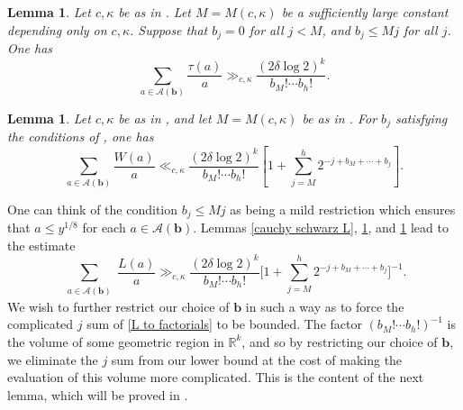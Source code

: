 \documentclass{amsart}
\newtheorem{lemma}[theorem]{Lemma}
\theoremstyle{definition}
\numberwithin{equation}{section}
\newcommand{\density}{\delta}
\begin{document}
	\begin{lemma}\label{LB tau} Let $c,\kappa$ be as in . Let $M = M(c,\kappa)$ be a sufficiently large constant depending only on $c,\kappa$. Suppose that $b_j = 0$ for all $j < M$, and $b_j \leq M j$ for all $j$. One has
		\begin{equation}
			\sum_{a \in \mathscr{A}(\bm{b})} \frac{\tau(a)}{a} \gg_{c,\kappa} \frac{(2 \density \log 2)^k}{b_M! \cdots b_h!}.
		\end{equation}
	\end{lemma}
	
	\begin{lemma}\label{LB W} Let $c,\kappa$ be as in , and let $M=M(c,\kappa)$ be as in . For $b_j$ satisfying the conditions of , one has
		\begin{equation}
			\sum_{a \in \mathscr{A}(\bm{b})} \frac{W(a)}{a} \ll_{c,\kappa} \frac{(2 \density \log 2)^k}{b_M! \cdots b_h!}\left[ 1 + \sum_{j = M}^h 2^{-j +b_M + \cdots +b_j} \right].
		\end{equation}
	\end{lemma}
	One can think of the condition $b_j \leq Mj$ as being a mild restriction which ensures that $a \leq y^{1/8}$ for each $a \in \mathscr{A}(\bm{b})$. Lemmas \ref{cauchy schwarz L}, \ref{LB tau}, and \ref{LB W} lead to the estimate
	\begin{equation}\label{L to factorials}
		\sum_{\substack{a \in \mathscr{A}(\bm{b})}} \frac{L(a)}{a} \gg_{c,\kappa}  \frac{(2 \density \log 2)^k}{b_M! \cdots b_h!} \bigg[ 1 + \sum_{j =M}^h 2^{-j +b_M + \cdots +b_j} \bigg]^{-1}.
	\end{equation}
	We wish to further restrict our choice of $\bm{b}$ in such a way as to force the complicated $j$ sum of \eqref{L to factorials} to be bounded. The factor $(b_M! \cdots b_h!)^{-1}$ is the volume of some geometric region in $\mathbb{R}^k$, and so by restricting our choice of $\bm{b}$, we eliminate the $j$ sum from our lower bound at the cost of making the evaluation of this volume more complicated. This is the content of the next lemma, which will be proved in .
	
\end{document}
